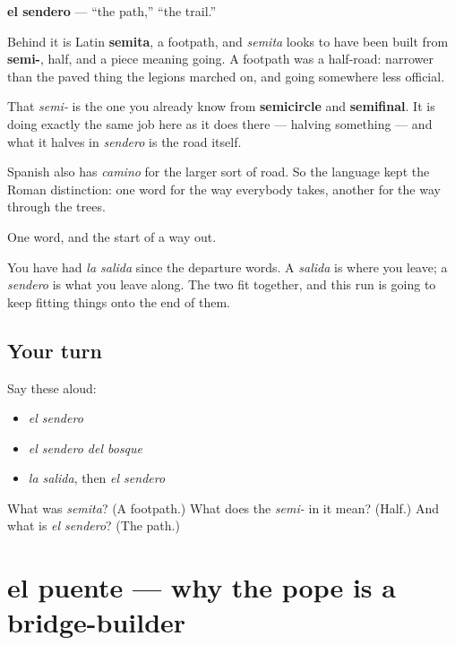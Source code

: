\begin{cousinweb}
\textbf{el sendero} — \textquotedblleft{}the path,\textquotedblright{} \textquotedblleft{}the trail.\textquotedblright{}

Behind it is Latin \textbf{semita}, a footpath, and \emph{semita} looks to have been built from \textbf{semi-}, half, and a piece meaning going. A footpath was a half-road: narrower than the paved thing the legions marched on, and going somewhere less official.

That \emph{semi-} is the one you already know from \textbf{semicircle} and \textbf{semifinal}. It is doing exactly the same job here as it does there — halving something — and what it halves in \emph{sendero} is the road itself.

Spanish also has \emph{camino} for the larger sort of road. So the language kept the Roman distinction: one word for the way everybody takes, another for the way through the trees.
\end{cousinweb}

\begin{grammarlens}[title={What you've built}]
One word, and the start of a way out.

You have had \emph{la salida} since the departure words. A \emph{salida} is where you leave; a \emph{sendero} is what you leave along. The two fit together, and this run is going to keep fitting things onto the end of them.
\end{grammarlens}

\subsection*{Your turn}
Say these aloud:

\begin{itemize}
\raggedright
  \item \emph{el sendero}
  \item \emph{el sendero del bosque}
  \item \emph{la salida}, then \emph{el sendero}
\end{itemize}

\begin{tcolorbox}[breakable,colback=teal!4,colframe=teal!35!black,title={Before you move on}]
What was \emph{semita}? (A footpath.) What does the \emph{semi-} in it mean? (Half.) And what is \emph{el sendero}? (The path.)
\end{tcolorbox}
\section[el puente]{el puente — why the pope is a bridge-builder}

